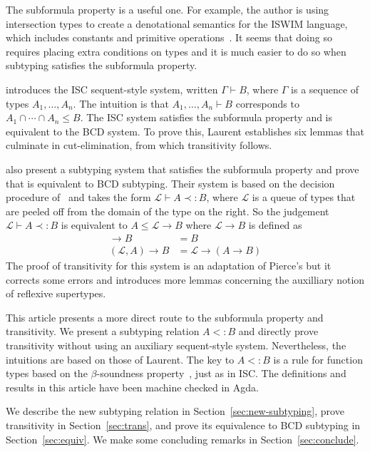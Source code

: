 \documentclass{article}
\begin{document}
The subformula property is a useful one. For example, the author is
using intersection types to create a denotational semantics for the
ISWIM language, which includes constants and primitive
operations~\citep{Landin:1966la,G.-D.-Plotkin:1975on,Felleisen:2009aa}.
It seems that doing so requires placing extra conditions on types and
it is much easier to do so when subtyping satisfies the subformula
property.

\citet{Laurent:2018aa} introduces the ISC sequent-style system,
written $\Gamma \vdash B$, where $\Gamma$ is a sequence of types
$A_1,\ldots,A_n$. The intuition is that $A_1,\ldots,A_n \vdash B$
corresponds to $A_1 \cap \cdots \cap A_n \leq B$. The ISC system satisfies the
subformula property and is equivalent to the BCD system. To prove
this, Laurent establishes six lemmas that culminate in
cut-elimination, from which transitivity follows.

\citet{Bi:2018aa} also present a subtyping system that satisfies the
subformula property and prove that is equivalent to BCD
subtyping. Their system is based on the decision procedure
of~\citet{Pierce:1989aa} and takes the form $\mathcal{L} \vdash A
\prec: B$, where $\mathcal{L}$ is a queue of types that are peeled off
from the domain of the type on the right. So the judgement
$\mathcal{L} \vdash A \prec: B$ is equivalent to $A \leq \mathcal{L}
\to B$ where $\mathcal{L} \to B$ is defined as
\begin{align*}
  [] \to B &= B\\
  (\mathcal{L},A) \to B &= \mathcal{L} \to (A \to B)
\end{align*}
The proof of transitivity for this system is an adaptation of Pierce's
but it corrects some errors and introduces more lemmas concerning the
auxilliary notion of reflexive supertypes.

This article presents a more direct route to the subformula property
and transitivity. We present a subtyping relation $A <: B$ and
directly prove transitivity without using an auxiliary sequent-style
system. Nevertheless, the intuitions are based on those of
Laurent. The key to $A <: B$ is a rule for function types based on the
$\beta$-soundness property~\citep{Barendregt:2013aa}, just as in ISC.
The definitions and results in this article have been machine checked
in Agda.

We describe the new subtyping relation in
Section~\ref{sec:new-subtyping}, prove transitivity in
Section~\ref{sec:trans}, and prove its equivalence to BCD subtyping in
Section~\ref{sec:equiv}. We make some concluding remarks in
Section~\ref{sec:conclude}.
    
\end{document}
